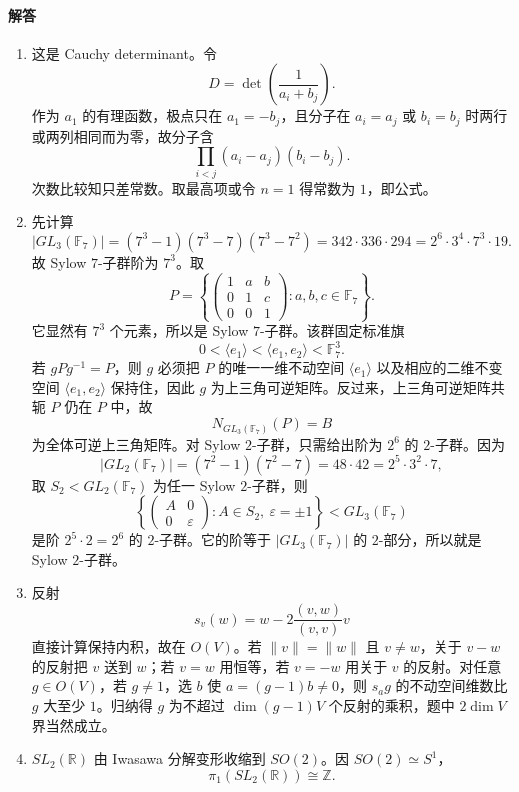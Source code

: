 \documentclass[UTF8,12pt]{ctexart}
\begin{document}
\paragraph{解答}
\begin{enumerate}[label=\textbf{\arabic*.},leftmargin=2.2em]
\item 这是 Cauchy determinant。令
\[
D=\det\left(\frac1{a_i+b_j}\right).
\]
作为 \(a_1\) 的有理函数，极点只在 \(a_1=-b_j\)，且分子在 \(a_i=a_j\) 或 \(b_i=b_j\) 时两行或两列相同而为零，故分子含
\[
\prod_{i<j}(a_i-a_j)(b_i-b_j).
\]
次数比较知只差常数。取最高项或令 \(n=1\) 得常数为 \(1\)，即公式。
\item 先计算
\[
|GL_3(\mathbb F_7)|=(7^3-1)(7^3-7)(7^3-7^2)
=342\cdot336\cdot294
=2^6\cdot3^4\cdot7^3\cdot19.
\]
故 Sylow \(7\)-子群阶为 \(7^3\)。取
\[
P=\left\{
\begin{pmatrix}
1&a&b\\
0&1&c\\
0&0&1
\end{pmatrix}:a,b,c\in\mathbb F_7
\right\}.
\]
它显然有 \(7^3\) 个元素，所以是 Sylow \(7\)-子群。该群固定标准旗
\[
0<\langle e_1\rangle<\langle e_1,e_2\rangle<\mathbb F_7^3.
\]
若 \(gPg^{-1}=P\)，则 \(g\) 必须把 \(P\) 的唯一一维不动空间 \(\langle e_1\rangle\) 以及相应的二维不变空间 \(\langle e_1,e_2\rangle\) 保持住，因此 \(g\) 为上三角可逆矩阵。反过来，上三角可逆矩阵共轭 \(P\) 仍在 \(P\) 中，故
\[
N_{GL_3(\mathbb F_7)}(P)=B
\]
为全体可逆上三角矩阵。对 Sylow \(2\)-子群，只需给出阶为 \(2^6\) 的 \(2\)-子群。因为
\[
|GL_2(\mathbb F_7)|=(7^2-1)(7^2-7)=48\cdot42=2^5\cdot3^2\cdot7,
\]
取 \(S_2<GL_2(\mathbb F_7)\) 为任一 Sylow \(2\)-子群，则
\[
\left\{
\begin{pmatrix}A&0\\0&\varepsilon\end{pmatrix}:
A\in S_2,\ \varepsilon=\pm1
\right\}
<GL_3(\mathbb F_7)
\]
是阶 \(2^5\cdot2=2^6\) 的 \(2\)-子群。它的阶等于 \(|GL_3(\mathbb F_7)|\) 的 \(2\)-部分，所以就是 Sylow \(2\)-子群。
\item 反射
\[
s_v(w)=w-2\frac{(v,w)}{(v,v)}v
\]
直接计算保持内积，故在 \(O(V)\)。若 \(\|v\|=\|w\|\) 且 \(v\ne w\)，关于 \(v-w\) 的反射把 \(v\) 送到 \(w\)；若 \(v=w\) 用恒等，若 \(v=-w\) 用关于 \(v\) 的反射。对任意 \(g\in O(V)\)，若 \(g\ne1\)，选 \(b\) 使 \(a=(g-1)b\ne0\)，则 \(s_ag\) 的不动空间维数比 \(g\) 大至少 \(1\)。归纳得 \(g\) 为不超过 \(\dim(g-1)V\) 个反射的乘积，题中 \(2\dim V\) 界当然成立。
\item \(SL_2(\mathbb R)\) 由 Iwasawa 分解变形收缩到 \(SO(2)\)。因 \(SO(2)\simeq S^1\)，
\[
\pi_1(SL_2(\mathbb R))\cong \mathbb Z.
\]
\end{enumerate}
\end{document}
